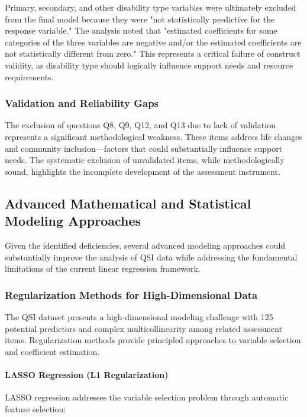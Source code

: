\documentclass[12pt]{article}
\begin{document}
Primary, secondary, and other disability type variables were ultimately excluded from the final model because they were "not statistically predictive for the response variable." The analysis noted that "estimated coefficients for some categories of the three variables are negative and/or the estimated coefficients are not statistically different from zero." This represents a critical failure of construct validity, as disability type should logically influence support needs and resource requirements.

\subsubsection{Validation and Reliability Gaps}

The exclusion of questions Q8, Q9, Q12, and Q13 due to lack of validation represents a significant methodological weakness. These items address life changes and community inclusion—factors that could substantially influence support needs. The systematic exclusion of unvalidated items, while methodologically sound, highlights the incomplete development of the assessment instrument.

\subsection{Advanced Mathematical and Statistical Modeling Approaches}

Given the identified deficiencies, several advanced modeling approaches could substantially improve the analysis of QSI data while addressing the fundamental limitations of the current linear regression framework.

\subsubsection{Regularization Methods for High-Dimensional Data}

The QSI dataset presents a high-dimensional modeling challenge with 125 potential predictors and complex multicollinearity among related assessment items. Regularization methods provide principled approaches to variable selection and coefficient estimation.

\paragraph{LASSO Regression (L1 Regularization)}
LASSO regression addresses the variable selection problem through automatic feature selection:
\end{document}
